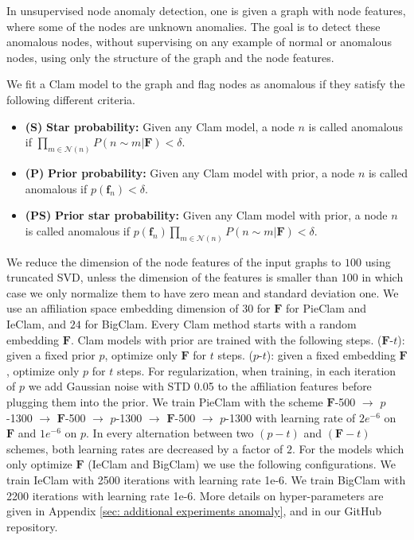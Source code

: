 \documentclass{article}
\theoremstyle{plain}
\theoremstyle{definition}
\theoremstyle{remark}
\begin{document}
In unsupervised node anomaly detection, one is given a graph with node features, where some of the nodes are unknown anomalies. The goal is to detect these anomalous nodes, without supervising on any example of normal or anomalous nodes,  using  only the structure of the graph and the node features.  
%

We  fit a Clam model to the graph and flag nodes as anomalous if they satisfy the following different criteria.
\begin{itemize}
    \item 
    \textbf{(S)} \textbf{Star probability:} Given any Clam model, a node $n$ is called anomalous if $\prod_{m\in\mathcal{N}(n)}P(n\sim m| \mathbf{F})<\delta$. 
    \item 
    \textbf{(P)} \textbf{Prior probability:} Given any Clam model with prior, a node $n$ is called anomalous if $p(\mathbf{f}_n)<\delta$. 
    \item 
     \textbf{(PS)} \textbf{Prior star probability:} Given any Clam model with prior, a node $n$ is called anomalous if $p(\mathbf{f}_n)\prod_{m\in\mathcal{N}(n)}P(n\sim m| \mathbf{F})<\delta$. 
\end{itemize}
 We reduce the dimension of the node features of the input graphs to $100$ using truncated SVD, unless the dimension of the features is smaller than $100$ in which case we only normalize them to have zero mean and standard deviation one.   We use an affiliation space embedding dimension of 30 for $\mathbf{F}$ for PieClam and IeClam, and $24$ for BigClam.
Every Clam method starts with a random embedding $\mathbf{F}$.  Clam models with prior are trained with the following steps. 
 ($\mathbf{F}$-$t$): given a fixed prior $p$, optimize only $\mathbf{F}$ for $t$ steps. ($p$-$t$): given a fixed embedding $\mathbf{F}$, optimize only $p$ for $t$ steps. For regularization, when training, in each iteration of $p$ we add Gaussian noise with STD 0.05 to the affiliation features before plugging them into the prior.  We train PieClam with the scheme $\mathbf{F}$-500 $\rightarrow$ $p$-1300 $\rightarrow$ $\mathbf{F}$-500 $\rightarrow$ $p$-1300 $\rightarrow$ $\mathbf{F}$-500 $\rightarrow$ $p$-1300 with learning rate of $2e^{-6}$ on $\mathbf{F}$  and $1e^{-6}$ on $p$.
 In every alternation between two $(p-t)$ and $(\mathbf{F}-t)$ schemes, both learning rates are decreased by a factor of $2$.
For the models which only optimize $\mathbf{F}$ (IeClam and BigClam)  we use the following configurations. We train IeClam with 2500 iterations with learning rate 1e-6. We train BigClam with 2200 iterations with learning rate 1e-6.
More details on hyper-parameters are given in Appendix \ref{sec: additional experiments anomaly}, and in our GitHub repository.
\end{document}
